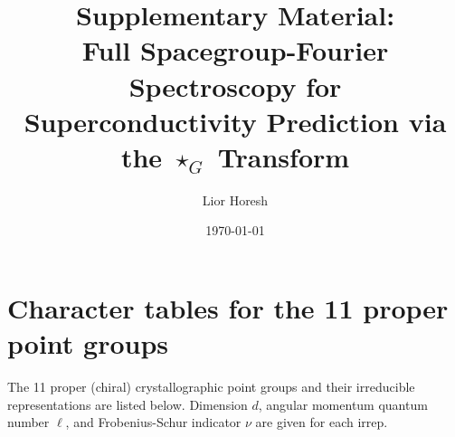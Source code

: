 \documentclass[aps,prb,onecolumn]{revtex4-2}
\newcommand{\starG}{\star_G}
\begin{document}
\title{Supplementary Material:\\
  Full Spacegroup-Fourier Spectroscopy for\\
  Superconductivity Prediction via the $\starG$ Transform}

\author{Lior Horesh}

\date{\today}

\maketitle

\section{Character tables for the 11 proper point groups}
\label{sec:irrep-tables}

The 11 proper (chiral) crystallographic point groups and their
irreducible representations are listed below. Dimension $d$,
angular momentum quantum number $\ell$, and Frobenius-Schur
indicator $\nu$ are given for each irrep.
\end{document}
